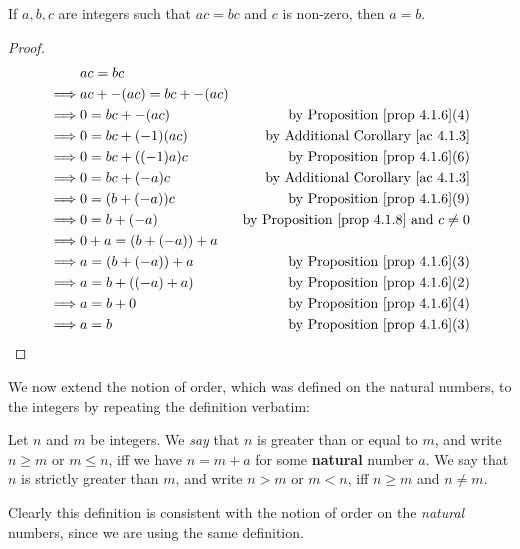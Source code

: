 \begin{corollary}  \label{corollary 4.1.9}
If \(a, b, c\) are integers such that \(ac = bc\) and \(c\) is non-zero, then \(a = b\).
\end{corollary}

\begin{proof}
\begin{align*}
             & ac = bc \\
    \implies & ac + -(ac) = bc + -(ac) \\
    \implies & 0 = bc + -(ac) & \text{by \PROP{4.1.6}(4)} \\
    \implies & 0 = bc + (-1)(ac) & \text{by \AC{4.1.3}} \\
    \implies & 0 = bc + ((-1)a)c & \text{by \PROP{4.1.6}(6)} \\
    \implies & 0 = bc + (-a)c & \text{by \AC{4.1.3}} \\
    \implies & 0 = (b + (-a))c & \text{by \PROP{4.1.6}(9)} \\
    \implies & 0 = b + (-a) & \text{by \PROP{4.1.8} and \(c \neq 0\)} \\
    \implies & 0 + a = (b + (-a)) + a \\
    \implies & a = (b + (-a)) + a & \text{by \PROP{4.1.6}(3)} \\
    \implies & a = b + ((-a) + a) & \text{by \PROP{4.1.6}(2)} \\
    \implies & a = b + 0 & \text{by \PROP{4.1.6}(4)} \\
    \implies & a = b & \text{by \PROP{4.1.6}(3)}
\end{align*}
\end{proof}

We now extend the notion of order, which was defined on the natural numbers, to the integers by repeating the definition verbatim:

\begin{definition}  \label{def 4.1.10}
Let \(n\) and \(m\) be integers.
We \emph{say} that \(n\) is greater than or equal to \(m\), and write \(n \ge m\) or \(m \le n\), iff we have \(n = m + a\) for some \textbf{natural} number \(a\).
We say that \(n\) is strictly greater than \(m\), and write \(n > m\) or \(m < n\), iff \(n \ge m\) and \(n \neq m\).
\end{definition}

\begin{note}
Clearly this definition is consistent with the notion of order on the \emph{natural} numbers, since we are using the same definition.
\end{note}


